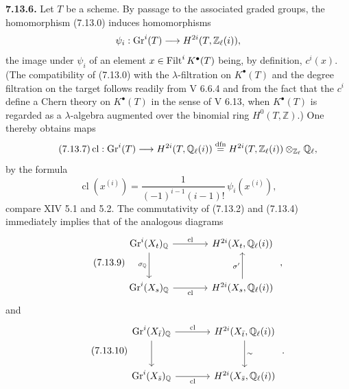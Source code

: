 \textbf{7.13.6.}
Let $T$ be a scheme. By passage to the associated graded groups, the
homomorphism (7.13.0) induces homomorphisms
\[
\psi_i:\operatorname{Gr}^i(T)\longrightarrow H^{2i}(T,\mathbb Z_\ell(i)),
\]
the image under $\psi_i$ of an element $x\in\operatorname{Filt}^iK^\bullet(T)$ being, by
definition, $c^i(x)$. (The compatibility of (7.13.0) with the
$\lambda$-filtration on
$K^\bullet(T)$ and the degree filtration on the target follows readily from
V 6.6.4 and from the fact that the $c^i$ define a
Chern theory on $K^\bullet(T)$ in the sense of V 6.13, when $K^\bullet(T)$ is
regarded as a $\lambda$-algebra augmented over the binomial ring
$H^0(T,\mathbb Z)$.) One thereby obtains maps
\begin{equation}\tag{7.13.7}
\operatorname{cl}:\operatorname{Gr}^i(T)\longrightarrow H^{2i}(T,\mathbb Q_\ell(i))
\stackrel{\mathrm{dfn}}{=}
H^{2i}(T,\mathbb Z_\ell(i))\otimes_{\mathbb Z_\ell}\mathbb Q_\ell,
\end{equation}
by the formula
\begin{equation}\tag{7.13.8}
\operatorname{cl}(x^{(i)})=
\frac{1}{(-1)^{i-1}(i-1)!}\,\psi_i(x^{(i)}),
\end{equation}
compare XIV 5.1 and 5.2. The commutativity of (7.13.2) and (7.13.4)
immediately implies that of the analogous diagrams
\begin{equation}\tag{7.13.9}
\begin{tikzcd}[column sep=large,row sep=large]
\Gr^i(X_t)_{\mathbb Q} \arrow[r,"\operatorname{cl}"]
  \arrow[d,"\sigma_{\mathbb Q}"'] &
H^{2i}(X_t,\mathbb Q_\ell(i))\\
\Gr^i(X_s)_{\mathbb Q} \arrow[r,"\operatorname{cl}"'] &
H^{2i}(X_s,\mathbb Q_\ell(i)) \arrow[u,"\sigma'"]
\end{tikzcd}
\;,
\end{equation}
and
\begin{equation}\tag{7.13.10}
\begin{tikzcd}[column sep=large,row sep=large]
\Gr^i(X_{\bar t})_{\mathbb Q} \arrow[r,"\operatorname{cl}"] \arrow[d] &
H^{2i}(X_{\bar t},\mathbb Q_\ell(i)) \arrow[d,"\sim"]\\
\Gr^i(X_{\bar s})_{\mathbb Q} \arrow[r,"\operatorname{cl}"'] &
H^{2i}(X_{\bar s},\mathbb Q_\ell(i))
\end{tikzcd}
\;.
\end{equation}

